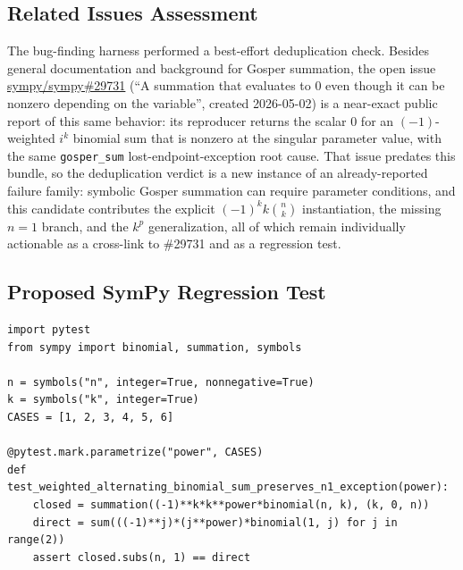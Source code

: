 \documentclass[11pt]{article}
\begin{document}
\subsection{Related Issues Assessment}

The bug-finding harness performed a best-effort deduplication check.  Besides
general documentation and background for Gosper summation, the open issue
\href{https://github.com/sympy/sympy/issues/29731}{sympy/sympy\#29731}
(``A summation that evaluates to 0 even though it can be nonzero depending on
the variable'', created 2026-05-02) is a near-exact public report of this same
behavior: its reproducer returns the scalar \(0\) for an \((-1)\)-weighted
\(i^k\) binomial sum that is nonzero at the singular parameter value, with the
same \texttt{gosper\_sum} lost-endpoint-exception root cause.  That issue
predates this bundle, so the deduplication verdict is a new instance of an
already-reported failure family: symbolic Gosper summation can require
parameter conditions, and this candidate contributes the explicit
\((-1)^k k\binom{n}{k}\) instantiation, the missing \(n=1\) branch, and the
\(k^p\) generalization, all of which remain individually actionable as a
cross-link to \#29731 and as a regression test.

\subsection{Proposed SymPy Regression Test}

\medskip

\begin{lstlisting}[style=bugpython]
import pytest
from sympy import binomial, summation, symbols

n = symbols("n", integer=True, nonnegative=True)
k = symbols("k", integer=True)
CASES = [1, 2, 3, 4, 5, 6]

@pytest.mark.parametrize("power", CASES)
def test_weighted_alternating_binomial_sum_preserves_n1_exception(power):
    closed = summation((-1)**k*k**power*binomial(n, k), (k, 0, n))
    direct = sum(((-1)**j)*(j**power)*binomial(1, j) for j in range(2))
    assert closed.subs(n, 1) == direct
\end{lstlisting}
\end{document}
